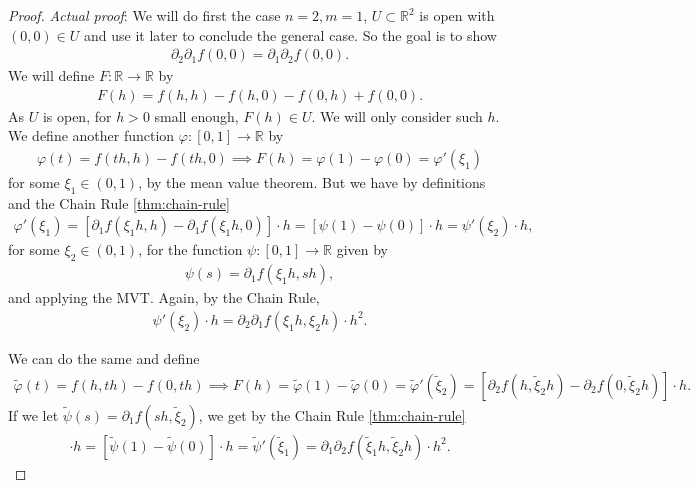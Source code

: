 \begin{proof}
    \textit{Actual proof}: We will do first the case $n = 2, m=1$, $U \subset \mathbb{R}^{2}$ is open with $(0,0) \in U$ and use it later to conclude the general case. So the goal is to show 
    \begin{align*}
        \partial_{2} \partial_{1} f(0,0) = \partial_{1} \partial_{2} f(0,0).
    \end{align*}
    We will define $F: \mathbb{R} \to \mathbb{R}$ by
    \begin{align*}
        F(h) = f(h,h) - f(h,0) - f(0,h) + f(0,0).
    \end{align*}
    As $U$ is open, for $h > 0$ small enough, $F(h) \in U$. We will only consider such $h$. We define another function $\varphi: [0,1] \to \mathbb{R}$ by 
    \begin{align*}
        \varphi(t) = f(th,h) - f(th,0) \implies F(h) = \varphi(1) - \varphi(0) = \varphi'(\xi_{1})
    \end{align*}
    for some $\xi_{1} \in (0,1)$, by the mean value theorem. But we have by definitions and the Chain Rule \ref{thm:chain-rule}
    \begin{align*}
        \varphi'(\xi_{1}) = [\partial_{1}f(\xi_{1}h, h) - \partial_{1}f(\xi_{1}h, 0)] \cdot h = [\psi(1) - \psi(0)]\cdot h = \psi'(\xi_{2})\cdot h,
    \end{align*}
    for some $\xi_{2} \in (0,1)$, for the function $\psi: [0,1] \to \mathbb{R}$ given by 
    \begin{align*}
        \psi(s)  = \partial_{1} f(\xi_{1}h, sh),
    \end{align*}
    and applying the MVT. Again, by the Chain Rule,
    \begin{align*}
        \psi'(\xi_{2})\cdot h = \partial_{2} \partial_{1} f(\xi_{1}h, \xi_{2} h) \cdot h^{2}.
    \end{align*}

    We can do the same and define 
    \begin{align*}
        \tilde{\varphi}(t) = f(h, th) - f(0, th) \implies F(h) = \tilde{\varphi}(1) - \tilde{\varphi}(0) = \tilde{\varphi}'(\tilde{\xi}_{2}) = [\partial_{2} f(h, \tilde{\xi}_{2}h) - \partial_{2} f(0, \tilde{\xi}_{2}h)] \cdot h.
    \end{align*}
    If we let $\tilde{\psi}(s) = \partial_{1}f(sh, \tilde{\xi}_{2})$, we get by the Chain Rule \ref{thm:chain-rule}
    \begin{align*}
        [\partial_{2} f(h, \tilde{\xi}_{2}h) - \partial_{2} f(0, \tilde{\xi}_{2}h)] \cdot h = [\tilde{\psi}(1) - \tilde{\psi}(0)] \cdot  h = \tilde{\psi}'(\tilde{\xi}_{1}) = \partial_{1} \partial_{2} f(\tilde{\xi}_{1}h, \tilde{\xi}_{2} h) \cdot h^{2}.
    \end{align*}


\end{proof}
